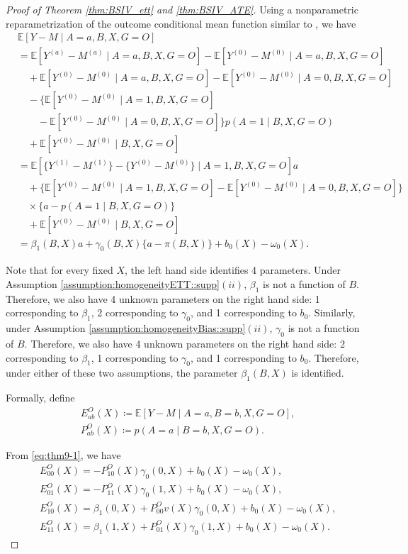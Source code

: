 \documentclass[10pt]{article}
\newcommand{\E}{\mathbb{E}}
\begin{document}
\begin{proof}[Proof of Theorem \ref{thm:BSIV_ett} and \ref{thm:BSIV_ATE}]
Using a nonparametric reparametrization of the outcome conditional mean function similar to \citep{robins1994correcting,tchetgen2013alternative}, we have
\begin{equation}
\label{eq:thm9-1}
\begin{aligned}
&\E[Y-M\mid A=a,B,X,G=O]\\
&=\E[Y^{(a)}-M^{(a)}\mid A=a,B,X,G=O]-\E[Y^{(0)}-M^{(0)}\mid A=a,B,X,G=O]\\
&\quad+\E[Y^{(0)}-M^{(0)}\mid A=a,B,X,G=O]-\E[Y^{(0)}-M^{(0)}\mid A=0,B,X,G=O]\\
&\quad-\{\E[Y^{(0)}-M^{(0)}\mid A=1,B,X,G=O]\\
&\quad\quad-\E[Y^{(0)}-M^{(0)}\mid A=0,B,X,G=O]\}p(A=1\mid B,X,G=O)\\
&\quad+\E[Y^{(0)}-M^{(0)}\mid B,X,G=O]\\
&=\E[\{Y^{(1)}-M^{(1)}\}-\{Y^{(0)}-M^{(0)}\}\mid A=1,B,X,G=O]a\\
&\quad+\{\E[Y^{(0)}-M^{(0)}\mid A=1,B,X,G=O]-\E[Y^{(0)}-M^{(0)}\mid A=0,B,X,G=O]\}\\
&\quad\times\{a-p(A=1\mid B,X,G=O)\}\\
&\quad+\E[Y^{(0)}-M^{(0)}\mid B,X,G=O]\\
&=\beta_1(B,X)a+\gamma_0(B,X)\{a-\pi(B,X)\}+b_0(X)-\omega_0(X).
\end{aligned}
\end{equation}

Note that for every fixed $X$, the left hand side identifies 4 parameters.
Under Assumption \ref{assumption:homogeneityETT::supp}$(ii)$, $\beta_1$ is not a function of $B$. Therefore, we also have 4 unknown parameters on the right hand side: 1 corresponding to $\beta_1$, 2 corresponding to $\gamma_0$, and 1 corresponding to $b_0$.
Similarly, under Assumption \ref{assumption:homogeneityBias::supp}$(ii)$, $\gamma_0$ is not a function of $B$. Therefore, we also have 4 unknown parameters on the right hand side: 2 corresponding to $\beta_1$, 1 corresponding to $\gamma_0$, and 1 corresponding to $b_0$.
Therefore, under either of these two assumptions, the parameter $\beta_1(B,X)$ is identified. 

Formally, define
\begin{align*}
&E_{ab}^O(X)\coloneqq\E[Y-M\mid A=a,B=b,X,G=O],\\
&P_{ab}^O(X)\coloneqq p(A=a\mid B=b,X,G=O).	
\end{align*}

From \eqref{eq:thm9-1}, we have
\begin{align*}
&E_{00}^O(X)=-P_{10}^O(X)\gamma_0(0,X)+b_0(X)-\omega_0(X),\\
&E_{01}^O(X)=-P_{11}^O(X)\gamma_0(1,X)+b_0(X)-\omega_0(X),\\
&E_{10}^O(X)=\beta_1(0,X)+P_{00}^Ov(X)\gamma_0(0,X)+b_0(X)-\omega_0(X),\\
&E_{11}^O(X)=\beta_1(1,X)+P_{01}^O(X)\gamma_0(1,X)+b_0(X)-\omega_0(X).
\end{align*}


\end{proof}
\end{document}
